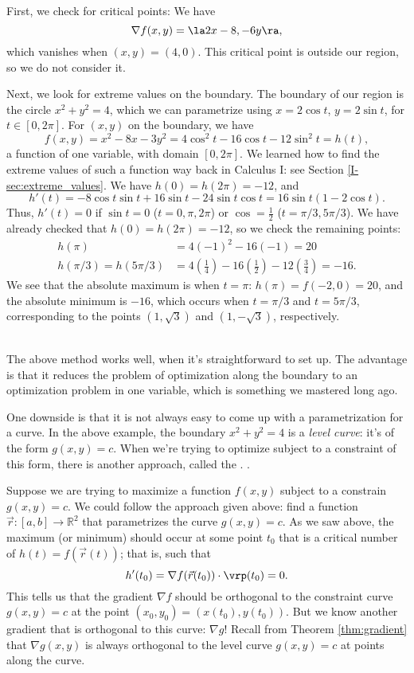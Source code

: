 {
First, we check for critical points: We have
\[
\nabla f(x,y) = \la 2x-8,-6y\ra,
\]
which vanishes when $(x,y) = (4,0)$. This critical point is outside our region, so we do not consider it.

Next, we look for extreme values on the boundary. The boundary of our region is the circle $x^2+y^2=4$, which we can parametrize using $x=2\cos t$, $y=2\sin t$, for $t\in [0,2\pi]$. For $(x,y)$ on the boundary, we have
\[
f(x,y) = x^2-8x-3y^2 = 4\cos^2t-16\cos t-12\sin^2t = h(t),
\]
a function of one variable, with domain $[0,2\pi]$. We learned how to find the extreme values of such a function way back in Calculus I: see Section \ref{I-sec:extreme_values}. We have $h(0)=h(2\pi)=-12$, and
\[
h'(t) = -8\cos t\sin t+16\sin t-24\sin t\cos t = 16\sin t (1-2\cos t).
\]
Thus, $h'(t)=0$ if $\sin t = 0$ ($t=0,\pi,2\pi$) or $\cos =\frac12$ ($t=\pi/3, 5\pi/3$). We have already checked that $h(0)=h(2\pi)=-12$, so we check the remaining points:
\begin{align*}
h(\pi) &= 4(-1)^2-16(-1) = 20\\
h(\pi/3)=h(5\pi/3) & = 4\left(\frac14\right)-16\left(\frac{1}{2}\right)-12\left(\frac34\right) = -16.
\end{align*}
We see that the absolute maximum is when $t=\pi$: $h(\pi) = f(-2,0)=20$, and the absolute minimum is $-16$, which occurs when $t=\pi/3$ and $t=5\pi/3$, corresponding to the points $(1,\sqrt{3})$ and $(1,-\sqrt{3})$, respectively. 
}\\

The above method works well, when it's straightforward to set up. The advantage is that it reduces the problem of optimization along the boundary to an optimization problem in one variable, which is something we mastered long ago.

One downside is that it is not always easy to come up with a parametrization for a curve. In the above example, the boundary $x^2+y^2=4$ is a \emph{level curve}: it's of the form $g(x,y)=c$. When we're trying to optimize subject to a constraint of this form, there is another approach, called the . .

Suppose we are trying to maximize a function $f(x,y)$ subject to a constrain $g(x,y)=c$. We could follow the approach given above: find a function $\vec{r}: [a,b]\to \mathbb{R}^2$ that parametrizes the curve $g(x,y)=c$. As we saw above, the maximum (or minimum) should occur at some point $t_0$ that is a critical number of $h(t)=f(\vec{r}(t))$; that is, such that 
\[
h'(t_0)=\nabla f(\vec{r}(t_0))\cdot \vrp (t_0) = 0.
\]
This tells us that the gradient $\nabla f$ should be orthogonal to the constraint curve $g(x,y)=c$ at the point $(x_0,y_0)=(x(t_0),y(t_0))$. But we know another gradient that is orthogonal to this curve: $\nabla g$! Recall from Theorem \ref{thm:gradient} that $\nabla g(x,y)$ is always orthogonal to the level curve $g(x,y)=c$ at points along the curve.

